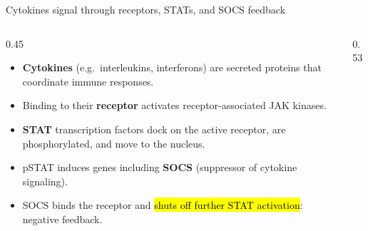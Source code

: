 \documentclass[aspectratio=169,10pt,t]{beamer}
\begin{document}
\begin{frame}{Cytokines signal through receptors, STATs, and SOCS feedback}
  \begin{columns}[c]
    \begin{column}{0.45\textwidth}
      \small
      \begin{itemize}[<+->]
        \setlength\itemsep{1mm}
        \item \textbf{Cytokines} (e.g.\ interleukins, interferons) are secreted
              proteins that coordinate immune responses.
        \item Binding to their \textbf{receptor} activates receptor-associated
              JAK kinases.
        \item \textbf{STAT} transcription factors dock on the active receptor, are
              phosphorylated, and move to the nucleus.
        \item pSTAT induces genes including \textbf{SOCS} (suppressor of cytokine
              signaling).
        \item SOCS binds the receptor and \hl{shuts off further STAT activation}:
              negative feedback.
      \end{itemize}
    \end{column}
    \begin{column}{0.53\textwidth}
      \centering
    \end{column}
  \end{columns}
\end{frame}
\end{document}
